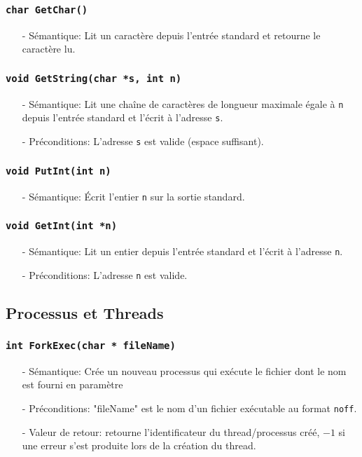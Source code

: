 \documentclass[11pt]{article}
\theoremstyle{definition}
\theoremstyle{definition}
\begin{document}
\subsubsection{\texttt{char GetChar()}}
\begin{itemize}
\item[-] Sémantique: Lit un caractère depuis l'entrée standard et retourne le caractère lu.
\end{itemize}

\subsubsection{\texttt{void GetString(char *s, int n)}}
\begin{itemize}
\item[-] Sémantique:
  Lit une chaîne de caractères de longueur maximale égale à \texttt{n} depuis l'entrée standard et
  l'écrit à l'adresse \texttt{s}.
\item[-] Préconditions: L'adresse \texttt{s} est valide (espace suffisant).
\end{itemize}

\subsubsection{\texttt{void PutInt(int n)}}
\begin{itemize}
\item[-] Sémantique: Écrit l'entier \texttt{n} sur la sortie standard.
\end{itemize}

\subsubsection{\texttt{void GetInt(int *n)}}
\begin{itemize}
\item[-] Sémantique: Lit un entier depuis l'entrée standard et l'écrit à l'adresse \texttt{n}.
\item[-] Préconditions: L'adresse \texttt{n} est valide.
\end{itemize}

\subsection{Processus et Threads}

\subsubsection{\texttt{int ForkExec(char * fileName)}}
 \begin{itemize}
 \item[-] Sémantique: Crée un nouveau processus qui exécute le fichier dont le nom est fourni en paramètre
 \item[-] Préconditions: "fileName" est le nom d'un fichier exécutable au format \texttt{noff}.
 \item[-] Valeur de retour: retourne l'identificateur du thread/processus créé, $-1$ si une erreur s'est produite lors de la création du thread.
 \end{itemize}
\end{document}
